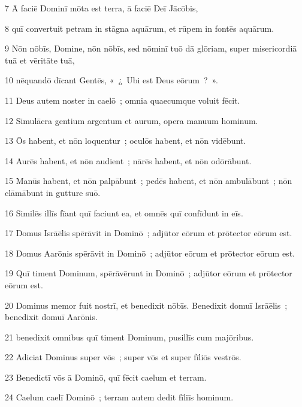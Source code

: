 \psalmVerse
  {\phantom{00}7}
  {Ā faciē Dominī mōta est terra, ā faciē Deī Jācōbis,}


\psalmVerse
  {\phantom{00}8}
  {quī convertuit petram in stāgna aquārum, et rūpem in fontēs aquārum.}


\psalmVerse
  {\phantom{00}9}
  {Nōn nōbīs, Domine, nōn nōbīs, sed nōminī tuō dā glōriam, super misericordiā tuā et vēritāte tuā,}


\psalmVerse
  {\phantom{0}10}
  {nēquandō dīcant Gentēs, «~¿~Ubi est Deus eōrum~?~».}


\psalmVerse
  {\phantom{0}11}
  {Deus autem noster in caelō~; omnia quaecumque voluit fēcit.}


\psalmVerse
  {\phantom{0}12}
  {Simulācra gentium argentum et aurum, opera manuum hominum.}


\psalmVerse
  {\phantom{0}13}
  {Ōs habent, et nōn loquentur~; oculōs habent, et nōn vidēbunt.}


\psalmVerse
  {\phantom{0}14}
  {Aurēs habent, et nōn audient~; nārēs habent, et nōn odōrābunt.}


\psalmVerse
  {\phantom{0}15}
  {Manūs habent, et nōn palpābunt~; pedēs habent, et nōn ambulābunt~; nōn clāmābunt in gutture suō.}


\psalmVerse
  {\phantom{0}16}
  {Similēs illīs fīant quī faciunt ea, et omnēs quī confīdunt in eīs.}


\psalmVerse
  {\phantom{0}17}
  {Domus Isrāēlis spērāvit in Dominō~; adjūtor eōrum et prōtector eōrum est.}


\psalmVerse
  {\phantom{0}18}
  {Domus Aarōnis spērāvit in Dominō~; adjūtor eōrum et prōtector eōrum est.}


\psalmVerse
  {\phantom{0}19}
  {Quī timent Dominum, spērāvērunt in Dominō~; adjūtor eōrum et prōtector eōrum est.}


\psalmVerse
  {\phantom{0}20}
  {Dominus memor fuit nostrī, et benedixit nōbīs. Benedixit domuī Isrāēlis~; benedixit domuī Aarōnis.}


\psalmVerse
  {\phantom{0}21}
  {benedixit omnibus quī timent Dominum, pusillīs cum majōribus.}


\psalmVerse
  {\phantom{0}22}
  {Adiciat Dominus super vōs~; super vōs et super fīliōs vestrōs.}


\psalmVerse
  {\phantom{0}23}
  {Benedictī vōs ā Dominō, quī fēcit caelum et terram.}


\psalmVerse
  {\phantom{0}24}
  {Caelum caelī Dominō~; terram autem dedit fīliīs hominum.}


